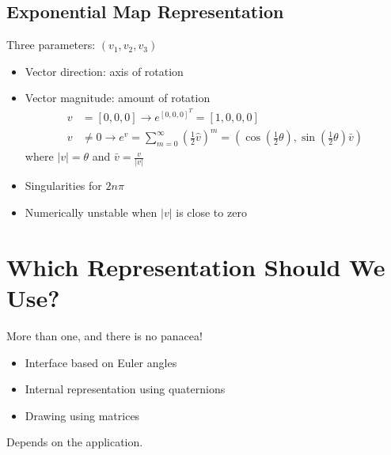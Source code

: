 \documentclass{article}
\begin{document}
\subsection*{Exponential Map Representation}
Three parameters: $(v_1, v_2, v_3)$
\begin{itemize}
    \item Vector direction: axis of rotation
    \item Vector magnitude: amount of rotation
    \begin{align*}
        v &= [0, 0, 0] \rightarrow e^{[0, 0, 0]^T} = [1, 0, 0, 0]\\
        v &\neq 0 \rightarrow e^v = \sum_{m = 0}^\infty \left(\frac{1}{2}\hat v\right)^m = (\cos(\frac{1}{2}\theta), \sin(\frac{1}{2}\theta)\bar v)
    \end{align*}
    where $\vert v \vert = \theta$ and $\bar v = \frac{v}{\vert v \vert}$
    \item Singularities for $2n\pi$
    \item Numerically unstable when $\vert v \vert$ is close to zero
\end{itemize}

\section*{Which Representation Should We Use?}
More than one, and there is no panacea!
\begin{itemize}
    \item Interface based on Euler angles
    \item Internal representation using quaternions
    \item Drawing using matrices
\end{itemize}
Depends on the application.
\end{document}
